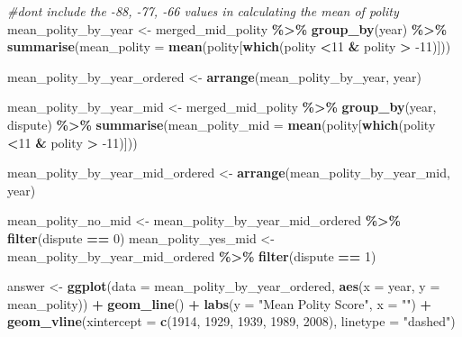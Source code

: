 \documentclass[
]{book}
\newenvironment{Shaded}{\begin{snugshade}}{\end{snugshade}}
\newcommand{\CommentTok}[1]{\textcolor[rgb]{0.56,0.35,0.01}{\textit{#1}}}
\newcommand{\DataTypeTok}[1]{\textcolor[rgb]{0.13,0.29,0.53}{#1}}
\newcommand{\DecValTok}[1]{\textcolor[rgb]{0.00,0.00,0.81}{#1}}
\newcommand{\KeywordTok}[1]{\textcolor[rgb]{0.13,0.29,0.53}{\textbf{#1}}}
\newcommand{\NormalTok}[1]{#1}
\newcommand{\OperatorTok}[1]{\textcolor[rgb]{0.81,0.36,0.00}{\textbf{#1}}}
\newcommand{\StringTok}[1]{\textcolor[rgb]{0.31,0.60,0.02}{#1}}
\theoremstyle{definition}
\theoremstyle{definition}
\theoremstyle{definition}
\theoremstyle{remark}
\begin{document}
\begin{Shaded}
\begin{Highlighting}[]
\CommentTok{\#don\textquotesingle{}t include the {-}88, {-}77, {-}66 values in calculating the mean of polity}
\NormalTok{mean\_polity\_by\_year <{-}}\StringTok{ }\NormalTok{merged\_mid\_polity }\OperatorTok{\%>\%}\StringTok{ }\KeywordTok{group\_by}\NormalTok{(year) }\OperatorTok{\%>\%}\StringTok{ }\KeywordTok{summarise}\NormalTok{(}\DataTypeTok{mean\_polity =} \KeywordTok{mean}\NormalTok{(polity[}\KeywordTok{which}\NormalTok{(polity }\OperatorTok{<}\DecValTok{11} \OperatorTok{\&}\StringTok{ }\NormalTok{polity }\OperatorTok{>}\StringTok{ }\DecValTok{{-}11}\NormalTok{)]))}

\NormalTok{mean\_polity\_by\_year\_ordered <{-}}\StringTok{ }\KeywordTok{arrange}\NormalTok{(mean\_polity\_by\_year, year) }

\NormalTok{mean\_polity\_by\_year\_mid <{-}}\StringTok{ }\NormalTok{merged\_mid\_polity }\OperatorTok{\%>\%}\StringTok{ }\KeywordTok{group\_by}\NormalTok{(year, dispute) }\OperatorTok{\%>\%}\StringTok{ }\KeywordTok{summarise}\NormalTok{(}\DataTypeTok{mean\_polity\_mid =} \KeywordTok{mean}\NormalTok{(polity[}\KeywordTok{which}\NormalTok{(polity }\OperatorTok{<}\DecValTok{11} \OperatorTok{\&}\StringTok{ }\NormalTok{polity }\OperatorTok{>}\StringTok{ }\DecValTok{{-}11}\NormalTok{)]))}

\NormalTok{mean\_polity\_by\_year\_mid\_ordered <{-}}\StringTok{ }\KeywordTok{arrange}\NormalTok{(mean\_polity\_by\_year\_mid, year) }

\NormalTok{mean\_polity\_no\_mid <{-}}\StringTok{ }\NormalTok{mean\_polity\_by\_year\_mid\_ordered }\OperatorTok{\%>\%}\StringTok{ }\KeywordTok{filter}\NormalTok{(dispute }\OperatorTok{==}\StringTok{ }\DecValTok{0}\NormalTok{)}
\NormalTok{mean\_polity\_yes\_mid <{-}}\StringTok{ }\NormalTok{mean\_polity\_by\_year\_mid\_ordered }\OperatorTok{\%>\%}\StringTok{ }\KeywordTok{filter}\NormalTok{(dispute }\OperatorTok{==}\StringTok{ }\DecValTok{1}\NormalTok{)}


\NormalTok{answer <{-}}\StringTok{ }\KeywordTok{ggplot}\NormalTok{(}\DataTypeTok{data =}\NormalTok{ mean\_polity\_by\_year\_ordered, }\KeywordTok{aes}\NormalTok{(}\DataTypeTok{x =}\NormalTok{ year, }\DataTypeTok{y =}\NormalTok{ mean\_polity)) }\OperatorTok{+}
\StringTok{  }\KeywordTok{geom\_line}\NormalTok{() }\OperatorTok{+}
\StringTok{  }\KeywordTok{labs}\NormalTok{(}\DataTypeTok{y =} \StringTok{"Mean Polity Score"}\NormalTok{,}
       \DataTypeTok{x =} \StringTok{""}\NormalTok{) }\OperatorTok{+}
\StringTok{  }\KeywordTok{geom\_vline}\NormalTok{(}\DataTypeTok{xintercept =} \KeywordTok{c}\NormalTok{(}\DecValTok{1914}\NormalTok{, }\DecValTok{1929}\NormalTok{, }\DecValTok{1939}\NormalTok{, }\DecValTok{1989}\NormalTok{, }\DecValTok{2008}\NormalTok{), }\DataTypeTok{linetype =} \StringTok{"dashed"}\NormalTok{)}


\end{Highlighting}
\end{Shaded}
\end{document}

